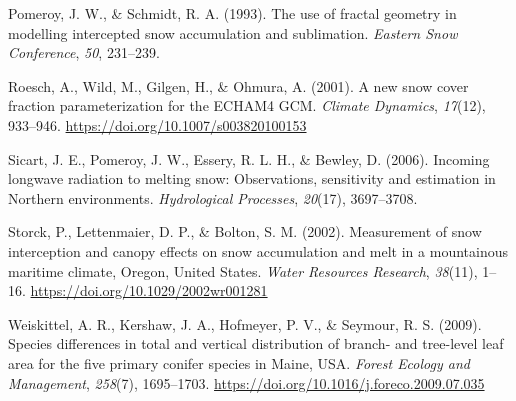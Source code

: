 \documentclass[
  letterpaper,
  DIV=11,
  numbers=noendperiod]{scrartcl}
\newlength{\cslhangindent}
\newenvironment{CSLReferences}[2] %
 {\begin{list}{}{%
  \setlength{\itemindent}{0pt}
  \setlength{\leftmargin}{0pt}
  \setlength{\parsep}{0pt}
  \ifodd #1
   \setlength{\leftmargin}{\cslhangindent}
   \setlength{\itemindent}{-1\cslhangindent}
  \fi
  \setlength{\itemsep}{#2\baselineskip}}}
 {\end{list}}
\begin{document}
\begin{CSLReferences}{1}{0}
Pomeroy, J. W., \& Schmidt, R. A. (1993). The use of fractal geometry in
modelling intercepted snow accumulation and sublimation. \emph{Eastern
Snow Conference}, \emph{50}, 231--239.

Roesch, A., Wild, M., Gilgen, H., \& Ohmura, A. (2001). A new snow cover
fraction parameterization for the {ECHAM4 GCM}. \emph{Climate Dynamics},
\emph{17}(12), 933--946. \url{https://doi.org/10.1007/s003820100153}

Sicart, J. E., Pomeroy, J. W., Essery, R. L. H., \& Bewley, D. (2006).
Incoming longwave radiation to melting snow: Observations, sensitivity
and estimation in {Northern} environments. \emph{Hydrological
Processes}, \emph{20}(17), 3697--3708.

Storck, P., Lettenmaier, D. P., \& Bolton, S. M. (2002). Measurement of
snow interception and canopy effects on snow accumulation and melt in a
mountainous maritime climate, {Oregon}, {United States}. \emph{Water
Resources Research}, \emph{38}(11), 1--16.
\url{https://doi.org/10.1029/2002wr001281}

Weiskittel, A. R., Kershaw, J. A., Hofmeyer, P. V., \& Seymour, R. S.
(2009). Species differences in total and vertical distribution of
branch- and tree-level leaf area for the five primary conifer species in
{Maine}, {USA}. \emph{Forest Ecology and Management}, \emph{258}(7),
1695--1703. \url{https://doi.org/10.1016/j.foreco.2009.07.035}

\end{CSLReferences}
\end{document}
